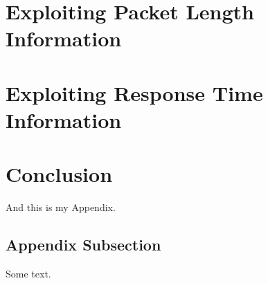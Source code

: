 \documentclass{river-journal}
\begin{document}
\section{Exploiting Packet Length Information}
\section{Exploiting Response Time Information}
\section{Conclusion}

\appendix

And this is my Appendix.

\subsection*{Appendix Subsection}

Some text.







%
%
\end{document}
